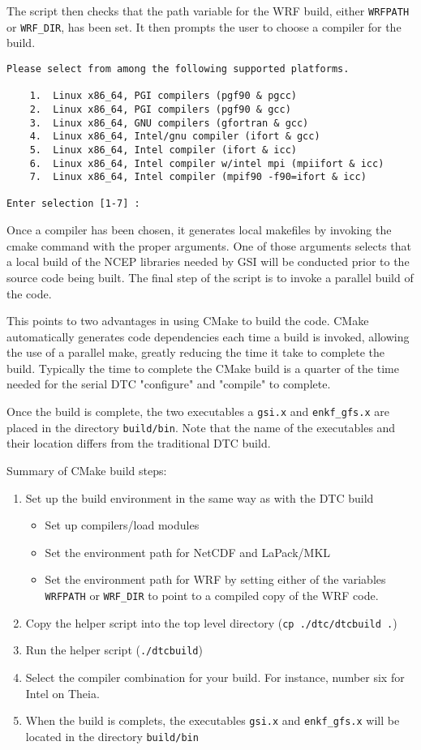 The script then checks that the path variable for the WRF build, either \verb|WRFPATH| or \verb|WRF_DIR|, has been set. 
It then prompts the user to choose a compiler for the build. 
\begin{verbatim}
Please select from among the following supported platforms.

    1.  Linux x86_64, PGI compilers (pgf90 & pgcc)
    2.  Linux x86_64, PGI compilers (pgf90 & gcc)
    3.  Linux x86_64, GNU compilers (gfortran & gcc)
    4.  Linux x86_64, Intel/gnu compiler (ifort & gcc)
    5.  Linux x86_64, Intel compiler (ifort & icc)
    6.  Linux x86_64, Intel compiler w/intel mpi (mpiifort & icc)
    7.  Linux x86_64, Intel compiler (mpif90 -f90=ifort & icc)

Enter selection [1-7] :
\end{verbatim}
Once a compiler has been chosen, it generates local makefiles by invoking the cmake command with the proper arguments. One of those arguments selects that a local build of the NCEP libraries needed by GSI will be conducted prior to the source code being built. The final step of the script is to invoke a parallel build of the code. 

This points to two advantages in using CMake to build the code. CMake automatically generates code dependencies each time a build is invoked, allowing the use of a parallel make, greatly reducing the time it take to complete the build. Typically the time to complete the CMake build is a quarter of the time needed for the serial DTC "configure" and "compile" to complete. 

Once the build is complete, the two executables a \verb|gsi.x| and \verb|enkf_gfs.x| are placed in the directory \verb|build/bin|. Note that the name of the executables and their location differs from the traditional DTC build.

Summary of CMake build steps:
\begin{enumerate}
\item Set up the build environment in the same way as with the DTC build 
\begin{itemize}
	\item Set up compilers/load modules
	\item Set the environment path for NetCDF and LaPack/MKL
	\item Set the environment path for WRF by setting either of the variables \verb|WRFPATH| or \verb|WRF_DIR| to point to a compiled copy of the WRF code.
\end{itemize}
\item Copy the helper script into the top level directory (\verb|cp ./dtc/dtcbuild .|)
\item Run the helper script (\verb|./dtcbuild|)
\item Select the compiler combination for your build. For instance, number six for Intel on Theia.
\item When the build is complets, the executables \verb|gsi.x| and \verb|enkf_gfs.x| will be located in the directory \verb|build/bin|
\end{enumerate}


